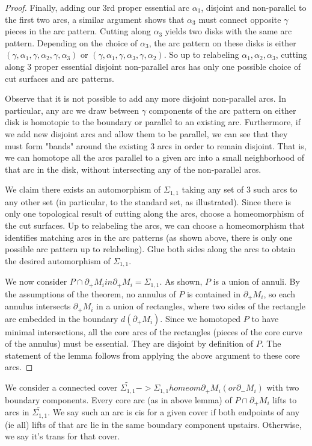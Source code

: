 \documentclass[12pt]{amsart}
\theoremstyle{definition}
\newcommand{\bd}{\partial}
\newcommand{\Si}{\Sigma}
\begin{document}
\begin{proof}
Finally, adding our 3rd proper essential arc $\alpha_3$, disjoint and
non-parallel to the first two arcs, a similar argument shows that $\alpha_3$
must connect opposite $\gamma$ pieces in the arc pattern. Cutting along
$\alpha_3$ yields two disks with the same arc pattern. Depending on the choice
of $\alpha_3$, the arc pattern on these disks is either
$(\gamma,\alpha_1,\gamma,\alpha_2,\gamma,\alpha_3)$ or
$(\gamma,\alpha_1,\gamma,\alpha_3,\gamma,\alpha_2)$. So up to relabeling
$\alpha_1,\alpha_2,\alpha_3$, cutting along 3 proper essential disjoint
non-parallel arcs has only one possible choice of cut surfaces and arc
patterns.

Observe that it is not possible to add any more disjoint non-parallel arcs. In
particular, any arc we draw between $\gamma$ components of the arc pattern on
either disk is homotopic to the boundary or parallel to an existing arc.
Furthermore, if we add new disjoint arcs and allow them to be parallel, we can
see that they must form "bands" around the existing 3 arcs in order to remain
disjoint. That is, we can homotope all the arcs parallel to a given arc into
a small neighborhood of that arc in the disk, without intersecting any of the
non-parallel arcs.

We claim there exists an automorphism of $\Si_{1,1}$ taking any set of 3 such
arcs to any other set (in particular, to the standard set, as illustrated).
Since there is only one topological result of cutting along the arcs, choose
a homeomorphism of the cut surfaces. Up to relabeling the arcs, we can choose
a homeomorphism that identifies matching arcs in the arc patterns (as shown
above, there is only one possible arc pattern up to relabeling). Glue both
sides along the arcs to obtain the desired automorphism of $\Si_{1,1}$.

We now consider $P \cap \bd_+M_i in \bd_+M_i = \Si_{1,1}$. As shown, $P$ is
a union of annuli. By the assumptions of the theorem, no annulus of $P$ is
contained in $\bd_+M_i$, so each annulus intersects $\bd_+M_i$ in a union of
rectangles, where two sides of the rectangle are embedded in the boundary
$d(\bd_+M_i)$. Since we homotoped $P$ to have minimal intersections, all the
core arcs of the rectangles (pieces of the core curve of the annulus) must be
essential. They are disjoint by definition of $P$. The statement of the lemma
follows from applying the above argument to these core arcs.

\end{proof}

We consider a connected cover $\widetilde{\Si_{1,1}} -> \Si_{1,1} homeom
\bd_+M_i (or \bd_-M_i)$ with two boundary components. Every core arc (as in
above lemma) of $P \cap \bd_+M_i$ lifts to arcs in $\widetilde{\Si_{1,1}}$. We
say such an arc is cis for a given cover if both endpoints of any (ie all)
lifts of that arc lie in the same boundary component upstairs. Otherwise, we
say it's trans for that cover.
\end{document}
